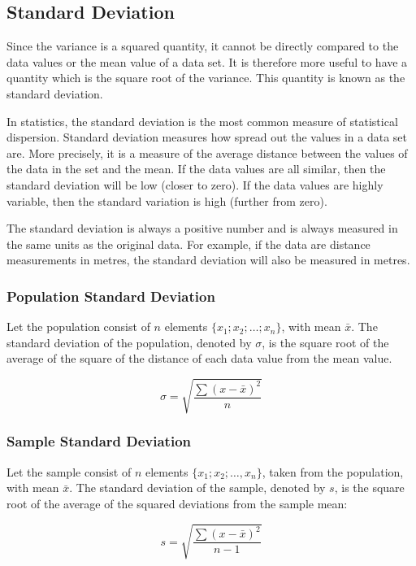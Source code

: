 \subsection{Standard Deviation}
Since the variance is a squared quantity, it cannot be directly compared to the data values or the mean value of a data set. It is therefore more useful to have a quantity which is the square root of the variance. This quantity is known as the standard deviation.

In statistics, the standard deviation is the most common measure of statistical dispersion. Standard deviation measures how spread out the values in a data set are. More precisely, it is a measure of the average distance between the values of the data in the set and the mean. If the data values are all similar, then the standard deviation will be low (closer to zero). If the data values are highly variable, then the standard variation is high (further from zero).

The standard deviation is always a positive number and is always measured in the same units as the original data. For example, if the data are distance measurements in metres, the standard deviation will also be measured in metres.

\subsubsection{Population Standard Deviation}
Let the population consist of $n$ elements $\{x_1;x_2;\ldots ;x_n\}$, with mean $\bar{x}$. The standard deviation of the population, denoted by $\sigma$, is the square root of the average of the square of the distance of each data value from the mean value.

\begin{equation}
\sigma = \sqrt{\frac{\sum(x - \bar{x})^2}{n}}
\label{eq:popstddev}
\end{equation}

\subsubsection{Sample Standard Deviation}
Let the sample consist of $n$ elements $\{x_1;x_2;\ldots,x_n\}$, taken from the population, with mean $\bar{x}$. The standard deviation of the sample, denoted by $s$, is the square root of the average of the squared deviations from the sample mean:

\begin{equation}
s = \sqrt{\frac{\sum(x - \bar{x})^2}{n-1}}
\end{equation}

